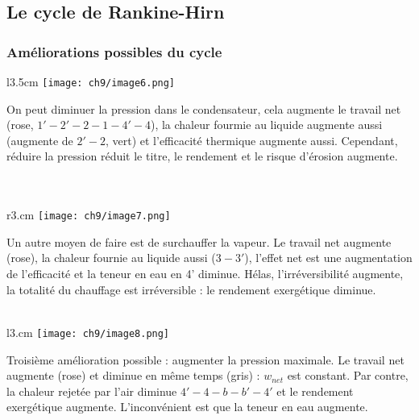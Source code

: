 	\subsection{Le cycle de Rankine-Hirn}
		\subsubsection{Améliorations possibles du cycle}
		\begin{wrapfigure}[8]{l}{3.5cm}
		\vspace{-5mm}
		\texttt{[image: ch9/image6.png]}
		\end{wrapfigure}
		On peut diminuer la pression dans le condensateur, cela augmente le 
		travail net (rose, $1'-2'-2-1-4'-4$), la chaleur fourmie au liquide 
		augmente aussi (augmente de $2'-2$, vert) et l'efficacité thermique 
		augmente aussi. Cependant, réduire la pression réduit le titre, le rendement et le 
		risque d'érosion augmente.\\\\
		\\
		
		
		\begin{wrapfigure}[8]{r}{3.cm}
		\vspace{-15mm}
		\texttt{[image: ch9/image7.png]}
		\end{wrapfigure}
		Un autre moyen de faire est de surchauffer la vapeur. Le travail net 
		augmente (rose), la chaleur fournie au liquide aussi ($3-3'$), l'effet 
		net est une augmentation de l’efficacité et la teneur en eau en 4' 
		diminue. Hélas, l'irréversibilité augmente, la totalité du chauffage 
		est irréversible : le rendement exergétique diminue.\\\\
		
		
		\begin{wrapfigure}[7]{l}{3.cm}
		\vspace{-8mm}
		\texttt{[image: ch9/image8.png]}
		\end{wrapfigure}		
		Troisième amélioration possible : augmenter la pression maximale. Le 
		travail net augmente (rose) et diminue en même temps (gris) : $w_{net}$ 
		est constant. Par contre, la chaleur rejetée par l'air diminue $4'-4-b
		-b'-4'$ et le rendement exergétique augmente. L'inconvénient est que la 
		teneur en eau augmente.\\
		\\
		
